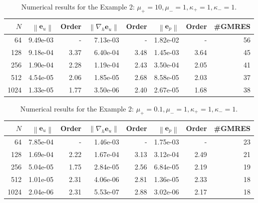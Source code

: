 \documentclass[preprint,11pt]{elsarticle}
\theoremstyle{remark}
\newcommand{\grad}[1]{\nabla #1}
\newcommand{\bm}[1]{\boldsymbol{#1}}
\newcommand{\norm}[1]{\left\lVert #1 \right\rVert}
\begin{document}
\begin{table}[htbp]
\centering
\caption{Numerical results for the Example 2: $\mu_+ = 10, \mu_- = 1, \kappa_+ = 1, \kappa_- = 1$.}
\label{tab:eg2-1}
\begin{tabular}{r r r r r r r r}
\hline
$N$ & $\norm{\bm e_u}$ & Order & $\norm{\nabla_h \bm e_u}$ & Order & $\norm{\bm e_p}$ & Order & \#GMRES \\
\hline
  64  & 9.49e-03 & - & 7.13e-03 & - & 1.82e-02 & - & 56 \\
 128  & 9.18e-04 & 3.37 & 6.40e-04 & 3.48 & 1.45e-03 & 3.64 & 45 \\
 256  & 1.90e-04 & 2.28 & 1.19e-04 & 2.43 & 3.50e-04 & 2.05 & 41 \\
 512  & 4.54e-05 & 2.06 & 1.85e-05 & 2.68 & 8.58e-05 & 2.03 & 37 \\
1024  & 1.33e-05 & 1.77 & 3.50e-06 & 2.40 & 2.67e-05 & 1.68 & 38 \\
\hline
\end{tabular}
\end{table}

\begin{table}[htbp]
\centering
\caption{Numerical results for the Example 2: $\mu_+ = 0.1, \mu_- = 1, \kappa_+ = 1, \kappa_- = 1$.}
\label{tab:eg2-2}
\begin{tabular}{r r r r r r r r}
\hline
$N$ & $\norm{\bm e_u}$ & Order & $\norm{\nabla_h \bm e_u}$ & Order & $\norm{\bm e_p}$ & Order & \#GMRES \\
\hline
  64  & 7.85e-04 & - & 1.46e-03 & - & 1.75e-03 & - & 23 \\
 128  & 1.69e-04 & 2.22 & 1.67e-04 & 3.13 & 3.12e-04 & 2.49 & 21 \\
 256  & 5.04e-05 & 1.75 & 2.84e-05 & 2.56 & 6.84e-05 & 2.19 & 19 \\
 512  & 1.01e-05 & 2.31 & 4.06e-06 & 2.81 & 1.36e-05 & 2.33 & 18 \\
1024  & 2.04e-06 & 2.31 & 5.53e-07 & 2.88 & 3.02e-06 & 2.17 & 18 \\
\hline
\end{tabular}
\end{table}
\end{document}
